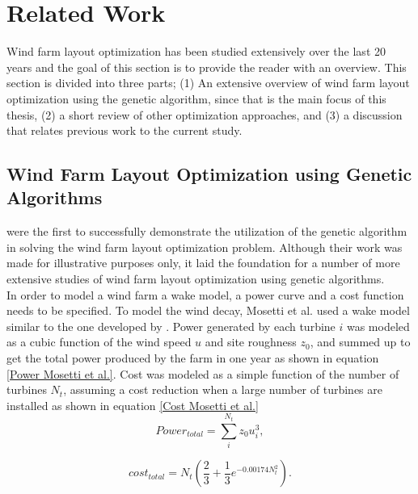 \chapter{Related Work}\label{chapter:relatedwork}
Wind farm layout optimization has been studied extensively over the last 20 years and the goal of this section is to provide the reader with an overview. This section is divided into three parts; (1) An extensive overview of wind farm layout optimization using the genetic algorithm, since that is the main focus of this thesis, (2) a short review of other optimization approaches, and (3) a discussion that relates previous work to the current study. 


\section{Wind Farm Layout Optimization using Genetic Algorithms}


\cite{Mosetti} were the first to successfully demonstrate the utilization of the genetic algorithm in solving the wind farm layout optimization problem. Although their work was made for illustrative purposes only, it laid the foundation for a number of more extensive studies of wind farm layout optimization using genetic algorithms.\\

\noindent In order to model a wind farm a wake model, a power curve and a cost function needs to be specified. To model the wind decay, Mosetti et al. used a wake model similar to the one developed by \cite{Jensen}. Power generated by each turbine $i$ was modeled as a cubic function of the wind speed $u$ and site roughness $z_0$, and summed up to get the total power produced by the farm in one year as shown in equation \ref{Power Mosetti et al.}. Cost was modeled as a simple function of the number of turbines $N_t$, assuming a cost reduction when a large number of turbines are installed as shown in equation \ref{Cost Mosetti et al.} \\


\begin{equation}
\label{Power Mosetti et al.}
Power_{total} = \sum^{N_t}_{i} z_0u_i^3,
\end{equation}


\begin{equation}
\label{Cost Mosetti et al.}
cost_{total} = N_t \left( \frac{2}{3} + \frac{1}{3}e^{-0.00174N_t^2} \right).
\end{equation}

